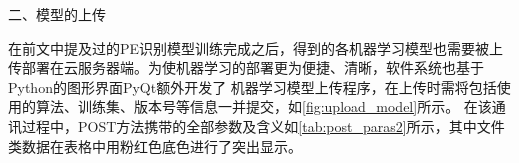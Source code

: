 






二、模型的上传

在前文中提及过的PE识别模型训练完成之后，得到的各机器学习模型也需要被上传部署在云服务器端。为使机器学习的部署更为便捷、清晰，软件系统也基于Python的图形界面PyQt额外开发了
机器学习模型上传程序，在上传时需将包括使用的算法、训练集、版本号等信息一并提交，如\autoref{fig:upload_model}所示。
在该通讯过程中，POST方法携带的全部参数及含义如\autoref{tab:post_paras2}所示，其中文件类数据在表格中用粉红色底色进行了突出显示。

